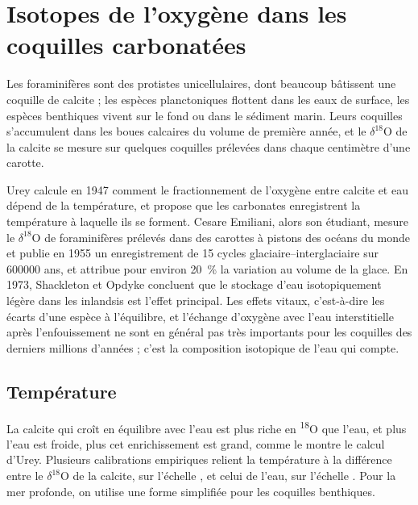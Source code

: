 \section{Isotopes de l'oxygène dans les coquilles carbonatées}\label{sec:b2:climate-proxies:oxygen}

Les foraminifères sont des protistes unicellulaires, dont beaucoup bâtissent une coquille de calcite ; les espèces
planctoniques flottent dans les eaux de surface, les espèces benthiques vivent sur le fond ou dans le sédiment marin.
Leurs coquilles s'accumulent dans les boues calcaires du volume de première année, et le $\delta^{18}$O de la
calcite se mesure sur quelques coquilles prélevées dans chaque centimètre d'une
carotte.

\begin{history}
Urey calcule en 1947 comment le fractionnement de l'oxygène entre calcite et eau dépend de la température,
et propose que les carbonates enregistrent la température à laquelle ils se forment. Cesare Emiliani, alors son
étudiant, mesure le $\delta^{18}$O de foraminifères prélevés dans des carottes à pistons des océans du monde et publie
en 1955 un enregistrement de 15 cycles glaciaire--interglaciaire sur \num{600000} ans, et attribue pour environ
\qty{20}{\percent} la variation au volume de la glace. En 1973, Shackleton et Opdyke concluent que le stockage
d'eau isotopiquement légère dans les inlandsis est l'effet principal. Les effets vitaux, c'est-à-dire les écarts
d'une espèce à l'équilibre, et l'échange d'oxygène avec l'eau interstitielle après l'enfouissement ne sont en
général pas très importants pour les coquilles des derniers millions d'années ; c'est la composition isotopique
de l'eau qui compte.
\end{history}

\subsection*{Température}

La calcite qui croît en équilibre avec l'eau est plus riche en \textsuperscript{18}O que l'eau,
et plus l'eau est froide, plus cet enrichissement est grand, comme le montre le calcul d'Urey. Plusieurs
calibrations empiriques relient
la température à la différence entre le $\delta^{18}$O de la calcite, sur l'échelle , et
celui de l'eau, sur l'échelle . Pour la mer profonde, on utilise une forme simplifiée pour les coquilles
benthiques.

